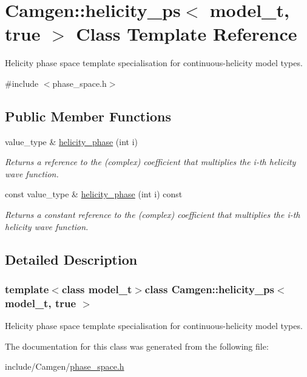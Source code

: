 \hypertarget{a00278}{}\section{Camgen\+:\+:helicity\+\_\+ps$<$ model\+\_\+t, true $>$ Class Template Reference}
\label{a00278}


Helicity phase space template specialisation for continuous-\/helicity model types.  




{\ttfamily \#include $<$phase\+\_\+space.\+h$>$}

\subsection*{Public Member Functions}
\begin{DoxyCompactItemize}
\item 
\hypertarget{a00278_a0bc312487ff58cb1f19cd60a58cc666c}{}value\+\_\+type \& \hyperlink{a00278_a0bc312487ff58cb1f19cd60a58cc666c}{helicity\+\_\+phase} (int i)\label{a00278_a0bc312487ff58cb1f19cd60a58cc666c}

\begin{DoxyCompactList}\small\item\em Returns a reference to the (complex) coefficient that multiplies the i-\/th helicity wave function. \end{DoxyCompactList}\item 
\hypertarget{a00278_ab7781a7dac360c05e1b74db7f04a5ed3}{}const value\+\_\+type \& \hyperlink{a00278_ab7781a7dac360c05e1b74db7f04a5ed3}{helicity\+\_\+phase} (int i) const \label{a00278_ab7781a7dac360c05e1b74db7f04a5ed3}

\begin{DoxyCompactList}\small\item\em Returns a constant reference to the (complex) coefficient that multiplies the i-\/th helicity wave function. \end{DoxyCompactList}\end{DoxyCompactItemize}


\subsection{Detailed Description}
\subsubsection*{template$<$class model\+\_\+t$>$class Camgen\+::helicity\+\_\+ps$<$ model\+\_\+t, true $>$}

Helicity phase space template specialisation for continuous-\/helicity model types. 



The documentation for this class was generated from the following file\+:\begin{DoxyCompactItemize}
\item 
include/\+Camgen/\hyperlink{a00718}{phase\+\_\+space.\+h}\end{DoxyCompactItemize}

